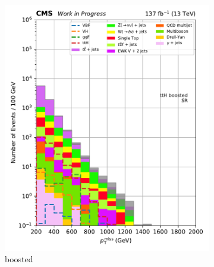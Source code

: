 \begin{figure}[htbp]
    \centering
    \begin{subfigure}[b]{0.24\textwidth}
        \includegraphics[width=\textwidth]{figures/region_plots/2016to18/region_0/ttH_boosted.pdf}
        \caption{\ttH boosted}
    \end{subfigure}
    \hfill
    \begin{subfigure}[b]{0.24\textwidth}

\end{subfigure}
\end{figure}
